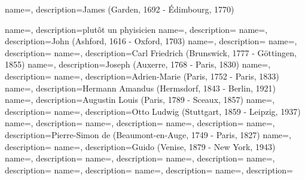 {
    name=,
    description={James (Garden, 1692 - Édimbourg, 1770)}
    }
    
 {
    name=,
    description={plutôt un phyisicien}
}
 {
    name=,
    description={}
}
 {
    name=,
    description={John  (Ashford, 1616 - Oxford, 1703)}
}
 {
    name=,
    description={}
}
 {
    name=,
    description={}
}
 {
    name=,
    description={Carl Friedrich (Brunswick, 1777 - Göttingen, 1855)}
}
 {
    name=,
    description={Joseph (Auxerre, 1768 - Paris, 1830)}
}
 {
    name=,
    description={}
}
 {
    name=,
    description={Adrien-Marie (Paris, 1752 - Paris, 1833)}
}
 {
    name=,
    description={Hermann Amandus (Hermsdorf, 1843 - Berlin, 1921)}
}
 {
    name=,
    description={Augustin Louis (Paris, 1789 - Sceaux, 1857)}
}
 {
    name=,
    description={}
}
 {
    name=,
    description={Otto Ludwig (Stuttgart, 1859 - Leipzig, 1937)}
}
 {
    name=,
    description={}
}
 {
    name=,
    description={}
}
 {
    name=,
    description={}
}
 {
    name=,
    description={Pierre-Simon de (Beaumont-en-Auge, 1749 - Paris, 1827)}
}
 {
    name=,
    description={}
}
 {
    name=,
    description={Guido (Venise, 1879 - New York, 1943)}
}
 {
    name=,
    description={}
}
 {
    name=,
    description={}
}
 {
    name=,
    description={}
}
 {
    name=,
    description={}
}
 {
    name=,
    description={}
}
 {
    name=,
    description={}
}
 {
    name=,
    description={}
}
